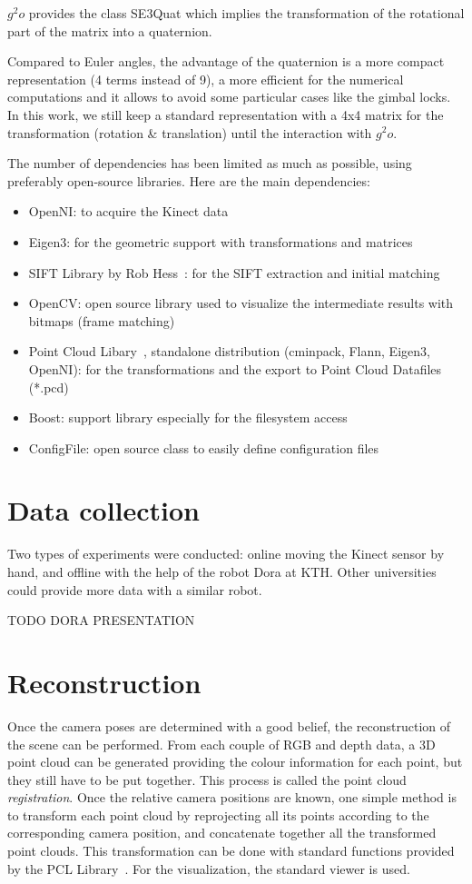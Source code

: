 $g^2o$ provides the class SE3Quat which implies the transformation of the rotational part of the matrix into a quaternion.

Compared to Euler angles, the advantage of the quaternion is a more compact representation (4 terms instead of 9), a more efficient for the numerical computations and it allows to avoid some particular cases like the gimbal locks. In this work, we still keep a standard representation with a 4x4 matrix for the transformation (rotation \& translation) until the interaction with $g^2o$.

The number of dependencies has been limited as much as possible, using preferably open-source libraries.
Here are the main dependencies:
\begin{itemize}
\item OpenNI: to acquire the Kinect data
\item Eigen3: for the geometric support with transformations and matrices
\item SIFT Library by Rob Hess~\cite{hess_sift}: for the SIFT extraction and initial matching
\item OpenCV: open source library used to visualize the intermediate results with bitmaps (frame matching)
\item Point Cloud Libary~\cite{Rusu_ICRA2011_PCL}, standalone distribution (cminpack, Flann, Eigen3, OpenNI): for the transformations and the export to Point Cloud Datafiles (*.pcd)
\item Boost: support library especially for the filesystem access
\item ConfigFile: open source class to easily define configuration files
\end{itemize}


\section{Data collection}

Two types of experiments were conducted: online moving the Kinect sensor by hand, and offline with the help of the robot Dora at KTH. Other universities could provide more data with a similar robot. 

TODO DORA PRESENTATION

\section{Reconstruction}

Once the camera poses are determined with a good belief, the reconstruction of the scene can be performed. From each couple of RGB and depth data, a 3D point cloud can be generated providing the colour information for each point, but they still have to be put together. This process is called the point cloud \emph{registration}. Once the relative camera positions are known, one simple method is to transform each point cloud by reprojecting all its points according to the corresponding camera position, and concatenate together all the transformed point clouds. This transformation can be done with standard functions provided by the PCL Library~\cite{Rusu_ICRA2011_PCL}. For the visualization, the standard viewer is used.

